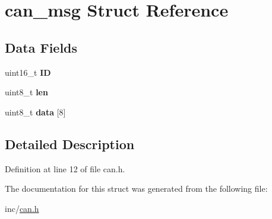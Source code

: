 \hypertarget{structcan__msg}{}\section{can\+\_\+msg Struct Reference}
\label{structcan__msg}
\subsection*{Data Fields}
\begin{DoxyCompactItemize}
\item 
\mbox{\label{structcan__msg_a25eca66d8c2a63407374b892c78a0fed}} 
uint16\+\_\+t {\bfseries ID}
\item 
\mbox{\label{structcan__msg_ad31937280463c2405ec071c786951436}} 
uint8\+\_\+t {\bfseries len}
\item 
\mbox{\label{structcan__msg_a6b8246516689e59dbd52e472e28dd8a3}} 
uint8\+\_\+t {\bfseries data} \mbox{[}8\mbox{]}
\end{DoxyCompactItemize}


\subsection{Detailed Description}


Definition at line 12 of file can.\+h.



The documentation for this struct was generated from the following file\+:\begin{DoxyCompactItemize}
\item 
inc/\hyperlink{can_8h}{can.\+h}\end{DoxyCompactItemize}
